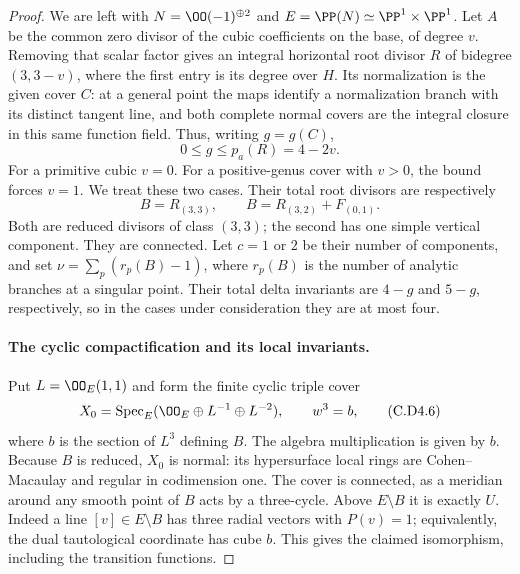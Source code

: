 \begin{proof}
We are left with $N=\OO(-1)^{\oplus2}$ and
$E=\PP(N)\simeq\PP^1\times\PP^1$. Let $A$ be the common
zero divisor of the cubic coefficients on the base, of degree
$v$. Removing that scalar factor gives an integral horizontal
root divisor $R$ of bidegree $(3,3-v)$, where the first entry
is its degree over $H$. Its normalization is the given
cover $C$: at a general point the maps identify a normalization
branch with its distinct tangent line, and both complete
normal covers are the integral closure in this same function
field. Thus, writing $g=g(C)$,
\[
                       0\le g\le p_a(R)=4-2v.
\tag{C.D4.4}\label{cdp:eq:C.D4.4}
\]
For a primitive cubic $v=0$. For a positive-genus cover with
$v>0$, the bound forces $v=1$. We treat these two cases.
Their total root divisors are respectively
\[
 B=R_{(3,3)},\qquad
 B=R_{(3,2)}+F_{(0,1)}.
\tag{C.D4.5}\label{cdp:eq:C.D4.5}
\]
Both are reduced divisors of class $(3,3)$; the second has
one simple vertical component. They are connected. Let
$c=1$ or $2$ be their number of components, and set
$\nu=\sum_p(r_p(B)-1)$, where $r_p(B)$ is the number of
analytic branches at a singular point. Their total delta
invariants are $4-g$ and $5-g$, respectively, so in the
cases under consideration they are at most four.

\paragraph{The cyclic compactification and its local invariants.}
Put $L=\OO_E(1,1)$ and form the finite cyclic triple cover
\[
 X_0=\operatorname{Spec}_E
       (\OO_E\oplus L^{-1}\oplus L^{-2}),\qquad w^3=b,
\tag{C.D4.6}\label{cdp:eq:C.D4.6}
\]
where $b$ is the section of $L^3$ defining $B$. The algebra
multiplication is given by $b$. Because $B$ is reduced,
$X_0$ is normal: its hypersurface local rings are Cohen--Macaulay
and regular in codimension one. The cover is connected,
as a meridian around any smooth point of $B$ acts by a
three-cycle. Above $E\setminus B$ it is exactly $U$.
Indeed a line $[v]\in E\setminus B$ has three radial vectors
with $P(v)=1$; equivalently, the dual tautological coordinate
has cube $b$. This gives the claimed isomorphism, including
the transition functions.


\end{proof}

